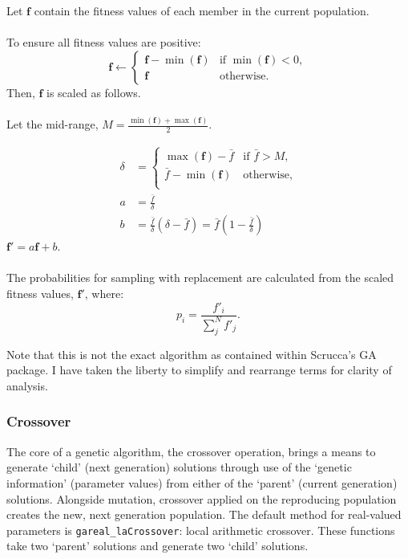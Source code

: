 \documentclass[
  a4paper,
  DIV=11,
  numbers=noendperiod]{scrartcl}
\newcommand{\B}[1]{\boldsymbol{#1}}
\newcommand{\+}{\phantom{-}}
\newcommand{\op}[2]{\operatorname{#1}\left(#2\right)}
\begin{document}
\begin{tcolorbox}[title=Selection with linear scaling: \texttt{gareal\_lsSelection()}]
Let $\B f$ contain the fitness values of each member in the current population.\\
\\
To ensure all fitness values are positive:
$$
\B f \leftarrow \begin{cases}
\B f- \op{min}{\B f} & \text{if } \op{min}{\B f} < 0,\\
\B f & \text{otherwise.}
\end{cases}
$$
Then, $\B f$ is scaled as follows.\\
\\
Let the mid-range, $M=\frac{\op{min}{\B f} +\op{max}{\B f}}2$.

$$
\begin{aligned}
\delta &=
\begin{cases}
\op{max}{\B f} - \bar f 
& \text{if } \bar f > M,
\\
\bar f -\op{min}{\B f} 
& \text{otherwise,}
\\
\end{cases}
\\
a&= 
\frac{\bar f}{\delta} \\
b&= 
\frac{\bar f}{\delta}\left(\delta - \bar f\right) = \bar f(1-\frac{\bar f}{\delta})
\end{aligned}
$$
$\B f' = a\B f + b$.\\
\\
The probabilities for sampling with replacement are calculated from the scaled fitness values, $\B f'$, where:
$$ p_i = \frac{f'_i}{\sum_j^Nf'_j}.$$

\end{tcolorbox}

Note that this is not the exact algorithm as contained within Scrucca's
GA package. I have taken the liberty to simplify and rearrange terms for
clarity of analysis.

\subsubsection{\texorpdfstring{\textbf{Crossover}}{Crossover}}\label{crossover}

The core of a genetic algorithm, the crossover operation, brings a means
to generate `child' (next generation) solutions through use of the
`genetic information' (parameter values) from either of the `parent'
(current generation) solutions. Alongside mutation, crossover applied on
the reproducing population creates the new, next generation population.
The default method for real-valued parameters is
\texttt{gareal\_laCrossover}: local arithmetic crossover. These
functions take two `parent' solutions and generate two `child'
solutions.
\end{document}
